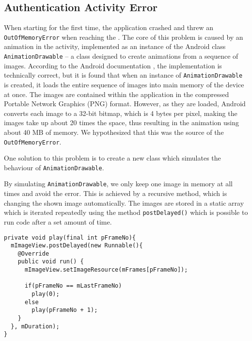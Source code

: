 \subsection{Authentication Activity Error}
When starting \launcher for the first time, the application crashed and threw an \lstinline{OutOfMemoryError} when reaching the \authenticationactivity.
The core of this problem is caused by an animation in the activity, implemented as an instance of the Android class \lstinline{AnimationDrawable} -- a class designed to create animations from a sequence of images.
According to the Android documentation \citet{androidreference}, the implementation is technically correct, but it is found that when an instance of \lstinline{AnimationDrawable} is created, it loads the entire sequence of images into main memory of the device at once.
The images are contained within the application in the compressed Portable Network Graphics (PNG) format.
However, as they are loaded, Android converts each image to a 32-bit bitmap, which is 4 bytes per pixel, making the images take up about 20 times the space, thus resulting in the animation using about 40 MB of memory. 
We hypothesized that this was the source of the \lstinline{OutOfMemoryError}.

One solution to this problem is to create a new class which simulates the behaviour of \lstinline{AnimationDrawable}.

By simulating \lstinline{AnimationDrawable}, we only keep one image in memory at all times and avoid the error.
This is achieved by a recursive method, which is changing the shown image automatically.
The images are stored in a static array which is iterated repeatedly using the method \lstinline|postDelayed()| which is possible to run code after a set amount of time.

\begin{lstlisting}[caption={Improved implementation of handling the animation.},label={lst:methodPlay}]
private void play(final int pFrameNo){
  mImageView.postDelayed(new Runnable(){
    @Override
    public void run() {                    
      mImageView.setImageResource(mFrames[pFrameNo]);

      if(pFrameNo == mLastFrameNo)
        play(0);
      else
        play(pFrameNo + 1);
    }
  }, mDuration);
}        
\end{lstlisting}